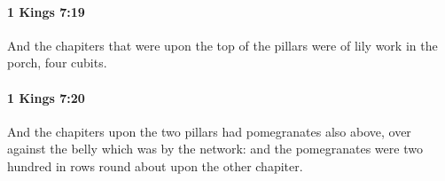		\paragraph{1 Kings 7:19} %
			\label{1KINGS-7-19}

			And the chapiters that were upon the top of the pillars were of lily work in the porch, four cubits.


		\paragraph{1 Kings 7:20} %
			\label{1KINGS-7-20}

			And the chapiters upon the two pillars had pomegranates also above, over against the belly which was by the network: and the pomegranates were two hundred in rows round about upon the other chapiter.


